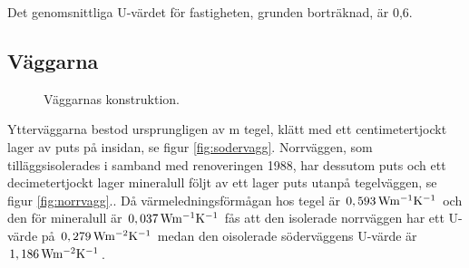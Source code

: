 Det genomsnittliga U-värdet för fastigheten, grunden borträknad, är 0,6.

\subsection{Väggarna}
\label{subsec:walls}

\begin{figure}[hpbt]
\centering
{}

\caption{\label{fig:thewalls} Väggarnas konstruktion.}
\end{figure}

Ytterväggarna bestod ursprungligen av \unit[0,5]{m} tegel, klätt med ett centimetertjockt lager av puts på insidan,
se figur \ref{fig:sodervagg}. Norrväggen, som tilläggsisolerades i samband med renoveringen 1988, har dessutom puts och ett decimetertjockt lager mineralull följt av ett lager puts utanpå tegelväggen,
se figur \ref{fig:norrvagg}.\cite{kandidatarbete2010}\cite{petersarneo}. Då värmeledningsförmågan hos tegel är
$\unit[0,593]{Wm^{-1}K^{-1}}$ och den för mineralull är $\unit[0,037]{Wm^{-1}K^{-1}}$
fås att den isolerade norrväggen har ett U-värde på $\unit[0,279]{Wm^{-2}K^{-1}}$
medan den oisolerade söderväggens U-värde är $\unit[1,186]{Wm^{-2}K^{-1}}$.

